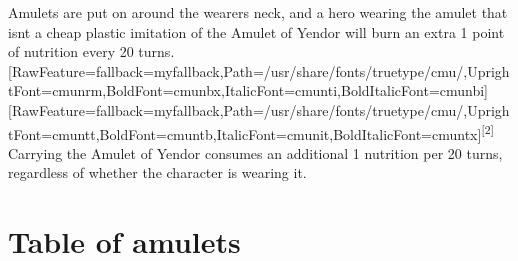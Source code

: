 Amulets are put on\footnotemark[33] around the wearer\textquotesingle{}s neck, and a hero\footnotemark[34] wearing the amulet that isn\textquotesingle{}t a cheap plastic imitation of the Amulet of Yendor\footnotemark[35] will burn an extra 1 point of nutrition\footnotemark[36] every 20 turns.\allowbreak{}\setmainfont{cmunrm.ttf}[RawFeature={fallback=myfallback},Path=/usr/share/fonts/truetype/cmu/,UprightFont=cmunrm,BoldFont=cmunbx,ItalicFont=cmunti,BoldItalicFont=cmunbi]\setmonofont{cmunrm.ttf}[RawFeature={fallback=myfallback},Path=/usr/share/fonts/truetype/cmu/,UprightFont=cmuntt,BoldFont=cmuntb,ItalicFont=cmunit,BoldItalicFont=cmuntx]\textsuperscript{{$\text{[}$}2{$\text{]}$}} Carrying the Amulet of Yendor consumes an additional 1 nutrition per 20 turns, regardless of whether the character is wearing it.



\section{Table of amulets}
\label{3}

